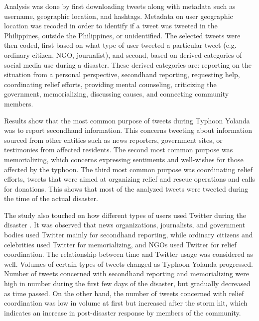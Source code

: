 Analysis was done by first downloading tweets along with metadata such as username, geographic location, and hashtags. Metadata on user geographic location was recoded in order to identify if a tweet was tweeted in the Philippines, outside the Philippines, or unidentified. The selected tweets were then coded, first based on what type of user tweeted a particular tweet (e.g. ordinary citizen, NGO, journalist), and second, based on derived categories of social media use during a disaster. These derived categories are: reporting on the situation from a personal perspective, secondhand reporting, requesting help, coordinating relief efforts, providing mental counseling, criticizing the government, memorializing, discussing causes, and connecting community members.  

Results show that the most common purpose of tweets during Typhoon Yolanda was to report secondhand information. This concerns tweeting about information sourced from other entities such as news reporters, government sites, or testimonies from affected residents. The second most common purpose was memorializing, which concerns expressing sentiments and well-wishes for those affected by the typhoon. The third most common purpose was coordinating relief efforts, tweets that were aimed at organizing relief and rescue operations and calls for donations. This shows that most of the analyzed tweets were tweeted during the time of the actual disaster.

The study also touched on how different types of users used Twitter during the disaster \cite{TTC2015}. It was observed that news organizations, journalists, and government bodies used Twitter mainly for secondhand reporting, while ordinary citizens and celebrities used Twitter for memorializing, and NGOs used Twitter for relief coordination. The relationship between time and Twitter usage was considered as well. Volumes of certain types of tweets changed as Typhoon Yolanda progressed. Number of tweets concerned with secondhand reporting and memorializing were high in number during the first few days of the disaster, but gradually decreased as time passed. On the other hand, the number of tweets concerned with relief coordination was low in volume at first but increased after the storm hit, which indicates an increase in post-disaster response by members of the community.

